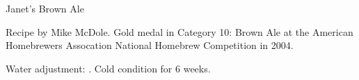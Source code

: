 \documentclass[parskip=half,fontsize=9pt,oneside]{scrbook}
\begin{document}
\mainmatter


\begin{recipe}{Janet's Brown Ale}

\begin{aboutblock}
Recipe by Mike McDole. Gold medal in Category 10: Brown Ale at the American
Homebrewers Assocation National Homebrew Competition in 2004.
\sourceaha
\end{aboutblock}


\begin{methodandtiming}

\begin{mashsteps}
\end{mashsteps}

\begin{fermentationsteps}
\end{fermentationsteps}

\begin{directions}
Water adjustment: . Cold condition for 6 weeks.
\end{directions}

\end{methodandtiming}

\recipebreak

\begin{ingredientsblock}

\begin{malts}
\end{malts}

\begin{hops}
\end{hops}


\end{ingredientsblock}

\end{recipe}


\end{document}
